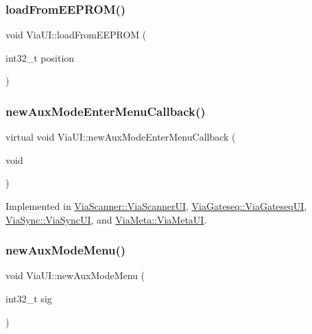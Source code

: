 \subsubsection{\texorpdfstring{load\+From\+E\+E\+P\+R\+O\+M()}{loadFromEEPROM()}}
{\footnotesize\ttfamily void Via\+U\+I\+::load\+From\+E\+E\+P\+R\+OM (\begin{DoxyParamCaption}\item[{int32\+\_\+t}]{position }\end{DoxyParamCaption})}

\mbox{\label{class_via_u_i_a6fdbe125cd3652807631631edc636d39}} 
\subsubsection{\texorpdfstring{new\+Aux\+Mode\+Enter\+Menu\+Callback()}{newAuxModeEnterMenuCallback()}}
{\footnotesize\ttfamily virtual void Via\+U\+I\+::new\+Aux\+Mode\+Enter\+Menu\+Callback (\begin{DoxyParamCaption}\item[{void}]{ }\end{DoxyParamCaption})\hspace{0.3cm}{\ttfamily [pure virtual]}}



Implemented in \mbox{\hyperlink{class_via_scanner_1_1_via_scanner_u_i_a8176484cc1deb6df08abfe1f0c1f789f}{Via\+Scanner\+::\+Via\+Scanner\+UI}}, \mbox{\hyperlink{class_via_gateseq_1_1_via_gateseq_u_i_ad6fb8d3cdf019a290c82a9d42f3f83a7}{Via\+Gateseq\+::\+Via\+Gateseq\+UI}}, \mbox{\hyperlink{class_via_sync_1_1_via_sync_u_i_a842b231f8014209b4e96b3b8c06b16e1}{Via\+Sync\+::\+Via\+Sync\+UI}}, and \mbox{\hyperlink{class_via_meta_1_1_via_meta_u_i_a5a1034beff03b3c5cdc12a9b3a7d0834}{Via\+Meta\+::\+Via\+Meta\+UI}}.

\mbox{\label{class_via_u_i_a104b7dbb35cab9ac82b61f364052dc07}} 
\subsubsection{\texorpdfstring{new\+Aux\+Mode\+Menu()}{newAuxModeMenu()}}
{\footnotesize\ttfamily void Via\+U\+I\+::new\+Aux\+Mode\+Menu (\begin{DoxyParamCaption}\item[{int32\+\_\+t}]{sig }\end{DoxyParamCaption})}

